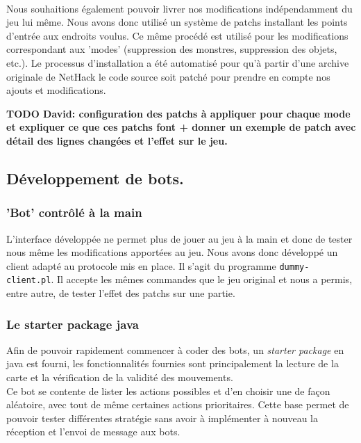 \documentclass[a4paper,12pt]{article}
\begin{document}
\paragraph{} Nous souhaitions également pouvoir livrer nos modifications
indépendamment du jeu lui même. Nous avons donc utilisé un système de patchs
installant les points d'entrée aux endroits voulus. Ce même procédé est
utilisé pour les modifications correspondant aux 'modes' (suppression des
monstres, suppression des objets, etc.). Le processus d'installation a été
automatisé pour qu'à partir d'une archive originale de NetHack le code source
soit patché pour prendre en compte nos ajouts et modifications.

\textbf{TODO David: configuration des patchs à appliquer pour chaque mode et
	expliquer ce que ces patchs font + donner un exemple de patch avec détail
	des lignes changées et l'effet sur le jeu.}


\subsection{Développement de bots.}

\subsubsection{'Bot' contrôlé à la main}

L'interface développée ne permet plus de jouer au jeu à la main et donc de
tester nous même les modifications apportées au jeu. Nous avons donc développé
un client adapté au protocole mis en place. Il s'agit du programme
\verb!dummy-client.pl!. Il accepte les mêmes commandes que le jeu original et
nous a permis, entre autre, de tester l'effet des patchs sur une partie.


\subsubsection{Le starter package java}
Afin de pouvoir rapidement commencer à coder des bots, un \emph{starter package}
en java est fourni, les fonctionnalités fournies sont principalement la lecture
de la carte et la vérification de la validité des mouvements.
\\
Ce bot se contente de lister les actions possibles et d'en choisir une de façon
aléatoire, avec tout de même certaines actions prioritaires. Cette base permet
de pouvoir tester différentes stratégie sans avoir à implémenter à nouveau la
réception et l'envoi de message aux bots.
\end{document}
